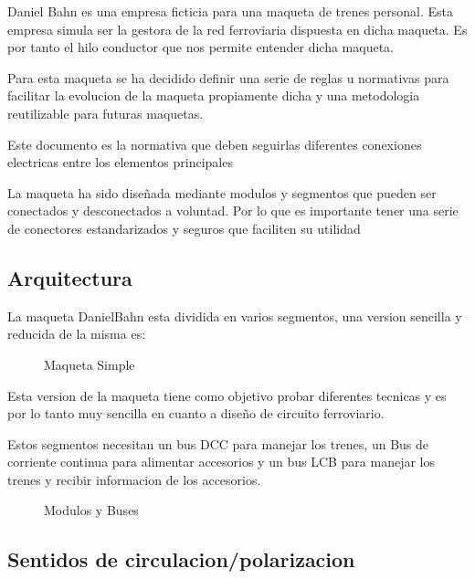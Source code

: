 Daniel Bahn es una empresa ficticia para una maqueta de trenes personal. Esta empresa simula ser la gestora de la red ferroviaria dispuesta en dicha maqueta.
Es por tanto el hilo conductor que nos permite entender dicha maqueta.

Para esta maqueta se ha decidido definir una serie de reglas u normativas para facilitar la evolucion de la maqueta propiamente dicha y una metodologia
reutilizable para futuras maquetas.

Este documento es la normativa que deben seguirlas diferentes conexiones electricas entre los elementos principales

La maqueta ha sido diseñada mediante modulos y segmentos que pueden ser conectados y desconectados a voluntad.
Por lo que es importante tener una serie de conectores estandarizados y seguros que faciliten su utilidad

\subsection{Arquitectura}
La maqueta DanielBahn esta dividida en varios segmentos, una version sencilla y reducida
 de la misma es:

\begin{figure}[H]
    \centering
    
    \caption{Maqueta Simple}
    \label{fig:MaquetaSimple}
\end{figure}

Esta version de la maqueta tiene como objetivo probar diferentes tecnicas
y es por lo tanto muy sencilla en cuanto a diseño de circuito ferroviario.

Estos segmentos necesitan un bus DCC para manejar los trenes, un Bus de corriente
continua para alimentar accesorios y un bus LCB para 
manejar los trenes y recibir informacion de los accesorios.

\begin{figure}[H]
    \centering
    
    \caption{Modulos y Buses}
    \label{fig:ModulosBuses}
\end{figure}

\subsection{Sentidos de circulacion/polarizacion}

